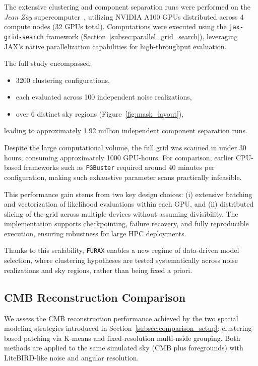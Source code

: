 \documentclass[fleqn,usenatbib]{mnras}
\begin{document}
The extensive clustering and component separation runs were performed on the \textit{Jean Zay} supercomputer~\citep{JeanZay2020}, utilizing NVIDIA A100 GPUs distributed across 4 compute nodes (32 GPUs total). Computations were executed using the \texttt{jax-grid-search} framework (Section~\ref{subsec:parallel_grid_search}), leveraging JAX's native parallelization capabilities for high-throughput evaluation.

The full study encompassed:
\begin{itemize}
    \item 3200 clustering configurations,
    \item each evaluated across 100 independent noise realizations,
    \item over 6 distinct sky regions (Figure~\ref{fig:mask_layout}),
\end{itemize}
leading to approximately 1.92 million independent component separation runs.

Despite the large computational volume, the full grid was scanned in under 30 hours, consuming approximately 1000 GPU-hours. For comparison, earlier CPU-based frameworks such as \texttt{FGBuster} required around 40 minutes per configuration, making such exhaustive parameter scans practically infeasible.

This performance gain stems from two key design choices: (i) extensive batching and vectorization of likelihood evaluations within each GPU, and (ii) distributed slicing of the grid across multiple devices without assuming divisibility. The implementation supports checkpointing, failure recovery, and fully reproducible execution, ensuring robustness for large HPC deployments.

Thanks to this scalability, \texttt{FURAX} enables a new regime of data-driven model selection, where clustering hypotheses are tested systematically across noise realizations and sky regions, rather than being fixed a priori.

\subsection{CMB Reconstruction Comparison}
\label{subsec:cmb_reconstruction}

We assess the CMB reconstruction performance achieved by the two spatial modeling strategies introduced in Section~\ref{subsec:comparison_setup}: clustering-based patching via K-means and fixed-resolution multi-nside grouping. Both methods are applied to the same simulated sky (CMB plus foregrounds) with LiteBIRD-like noise and angular resolution.
\end{document}
